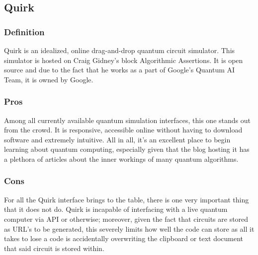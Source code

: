\documentclass[a4paper]{article}
\begin{document}
\label{QISKit}


\subsection{Quirk}%
\subsubsection{Definition} %
Quirk is an idealized, online drag-and-drop quantum circuit simulator. This simulator is hosted on Craig Gidney's block Algorithmic Assertions\cite{algoassert}.  It is open source and due to the fact that he works as a part of Google's Quantum AI Team, it is owned by Google.
\subsubsection{Pros}%
Among all currently available quantum simulation interfaces, this one stands out from the crowd.  It is responsive, accessible online without having to download software and extremely intuitive.  All in all, it's an excellent place to begin learning about quantum computing, especially given that the blog hosting it has a plethora of articles about the inner workings of many quantum algorithms.
\subsubsection{Cons}%
For all the Quirk interface brings to the table, there is one very important thing that it does not do.  Quirk is incapable of interfacing with a live quantum computer via API or otherwise; moreover, given the fact that circuits are stored as URL's to be generated, this severely limits how well the code can store as all it takes to lose a code is accidentally overwriting the clipboard or text document that said circuit is stored within.
\end{document}
